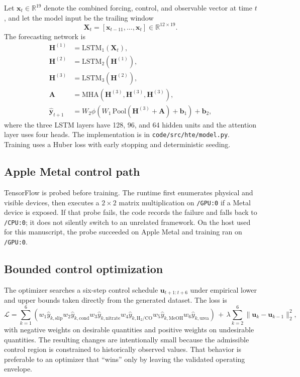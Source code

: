 \documentclass[11pt]{article}
\begin{document}
Let \(\mathbf{x}_t \in \mathbb{R}^{19}\) denote the combined forcing, control, and observable vector at time \(t\), and let the model input be the trailing window
\begin{equation}
\mathbf{X}_{t} = [\mathbf{x}_{t-11},\ldots,\mathbf{x}_{t}] \in \mathbb{R}^{12 \times 19}.
\end{equation}
The forecasting network is
\begin{align}
\mathbf{H}^{(1)} &= \mathrm{LSTM}_1(\mathbf{X}_t), \\
\mathbf{H}^{(2)} &= \mathrm{LSTM}_2(\mathbf{H}^{(1)}), \\
\mathbf{H}^{(3)} &= \mathrm{LSTM}_3(\mathbf{H}^{(2)}), \\
\mathbf{A} &= \mathrm{MHA}(\mathbf{H}^{(3)}, \mathbf{H}^{(3)}, \mathbf{H}^{(3)}), \\
\hat{\mathbf{y}}_{t+1} &= W_2 \phi\!\left(W_1 \,\mathrm{Pool}(\mathbf{H}^{(3)} + \mathbf{A}) + \mathbf{b}_1\right) + \mathbf{b}_2,
\end{align}
where the three LSTM layers have 128, 96, and 64 hidden units and the attention layer uses four heads. The implementation is in \texttt{code/src/hte/model.py}. Training uses a Huber loss with early stopping and deterministic seeding.

\subsection{Apple Metal control path}

TensorFlow is probed before training. The runtime first enumerates physical and visible devices, then executes a \(2\times2\) matrix multiplication on \texttt{/GPU:0} if a Metal device is exposed. If that probe fails, the code records the failure and falls back to \texttt{/CPU:0}; it does not silently switch to an unrelated framework. On the host used for this manuscript, the probe succeeded on Apple Metal and training ran on \texttt{/GPU:0}.

\subsection{Bounded control optimization}

The optimizer searches a six-step control schedule \(\mathbf{u}_{t+1:t+6}\) under empirical lower and upper bounds taken directly from the generated dataset. The loss is
\begin{equation}
\mathcal{L}
=
\sum_{k=1}^{6}
\left(
w_1 \hat{y}_{k,\mathrm{slip}}
w_2 \hat{y}_{k,\mathrm{cond}}
w_3 \hat{y}_{k,\mathrm{nitrate}}
w_4 \hat{y}_{k,\mathrm{H_2/CO}}
w_5 \hat{y}_{k,\mathrm{MeOH}}
w_6 \hat{y}_{k,\mathrm{urea}}
\right)
\,+\,
\lambda \sum_{k=2}^{6}\|\mathbf{u}_k-\mathbf{u}_{k-1}\|_2^2,
\end{equation}
with negative weights on desirable quantities and positive weights on undesirable quantities. The resulting changes are intentionally small because the admissible control region is constrained to historically observed values. That behavior is preferable to an optimizer that ``wins'' only by leaving the validated operating envelope.
\end{document}
